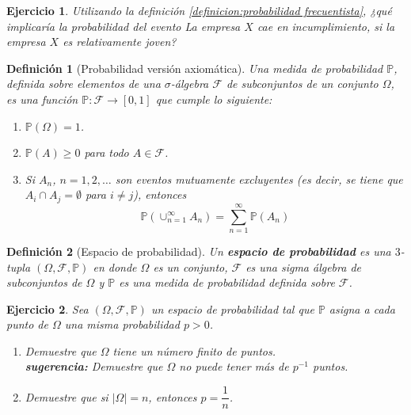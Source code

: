 \documentclass[11pt]{report}
\theoremstyle{break}
\newtheorem{definicion}{Definición}[chapter]
\newtheorem{ejercicio}{Ejercicio}[chapter]
\theoremstyle{break}
\begin{document}
\begin{ejercicio}
Utilizando la definición \ref{definicion:probabilidad frecuentista}, ¿qué implicaría la probabilidad del evento \textit{La empresa $X$ cae en incumplimiento}, si la empresa $X$ es relativamente joven?
\end{ejercicio}

\begin{definicion}[Probabilidad versión axiomática]
Una medida de probabilidad $\mathbb{P}$, definida sobre elementos de una $\sigma$-álgebra $\mathcal{F}$ de subconjuntos de un conjunto $\Omega$, es una función $\mathbb{P}:\mathcal{F} \rightarrow [0,1]$ que cumple lo siguiente:

\begin{enumerate}
\item $\mathbb{P}(\Omega) = 1$.
\item $\mathbb{P}(A) \geq 0$ para todo $A \in \mathcal{F}$.
\item Si $A_n$, $n=1,2,\ldots$ son eventos mutuamente excluyentes (es decir, se tiene que  $A_i \cap A_j = \emptyset$ para $i \neq j$), entonces 
$$
\mathbb{P}\left(\cup_{n=1}^{\infty}A_n \right) = \sum_{n=1}^{\infty}\mathbb{P}(A_n)
$$
\end{enumerate}
\end{definicion}

\begin{definicion}[Espacio de probabilidad]
\label{definicion:espacio de probabilidad}
Un \textbf{espacio de probabilidad} es una $3$-tupla $\left( \Omega, \mathcal{F}, \mathbb{P} \right)$ en donde $\Omega$ es un conjunto, $\mathcal{F}$ es una sigma álgebra de subconjuntos de $\Omega$ y $\mathbb{P}$ es una medida de probabilidad definida sobre $\mathcal{F}$.
\end{definicion}

\begin{ejercicio}
Sea $(\Omega, \mathcal{F}, \mathbb{P})$ un espacio de probabilidad tal que $\mathbb{P}$ asigna a cada punto de $\Omega$ una misma probabilidad $p > 0$.
\begin{enumerate}[label=\alph*)]
\item Demuestre que $\Omega$ tiene un número finito de puntos.\\ \textbf{sugerencia:} Demuestre que $\Omega$ no puede tener más de $p^{-1}$ puntos.

\item Demuestre que si $|\Omega| = n$, entonces $p = \dfrac{1}{n}$.
\end{enumerate}

\end{ejercicio}
\end{document}
